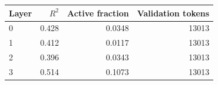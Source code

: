 \begin{tabular}{lrrr}
\toprule
Layer & $R^2$ & Active fraction & Validation tokens \\
\midrule
0 & 0.428 & 0.0348 & 13013 \\
1 & 0.412 & 0.0117 & 13013 \\
2 & 0.396 & 0.0343 & 13013 \\
3 & 0.514 & 0.1073 & 13013 \\
\bottomrule
\end{tabular}
